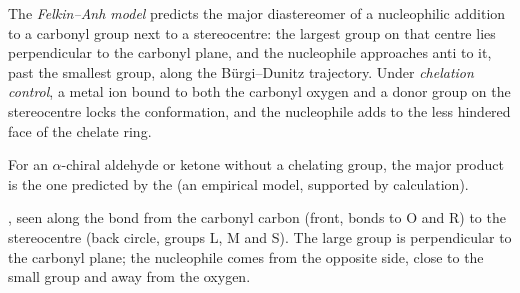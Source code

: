\begin{definition}\label{def:b3:asymmetric-synthesis:felkin}
The \emph{Felkin--Anh model} predicts the major
diastereomer of a nucleophilic addition to a carbonyl group next to a
stereocentre: the largest group on that centre lies perpendicular to the
carbonyl plane, and the nucleophile approaches anti to it, past the smallest
group, along the Bürgi--Dunitz trajectory. Under \emph{chelation
control}, a metal ion bound to both the carbonyl oxygen
and a donor group on the stereocentre locks the conformation, and the
nucleophile adds to the less hindered face of the chelate ring.
\end{definition}

\begin{proposition}\label{prop:b3:asymmetric-synthesis:felkin}
For an $\alpha$-chiral aldehyde or ketone without a chelating group, the major
product is the one predicted by the  (an empirical model,
supported by calculation). \admitted
\end{proposition}

\begin{omfigure}

{\small {}, seen along the bond from the carbonyl carbon (front,
bonds to O and R) to the stereocentre (back circle, groups L, M and S). The
large group is perpendicular to the carbonyl plane; the nucleophile comes from
the opposite side, close to the small group and away from the oxygen.}
\end{omfigure}

